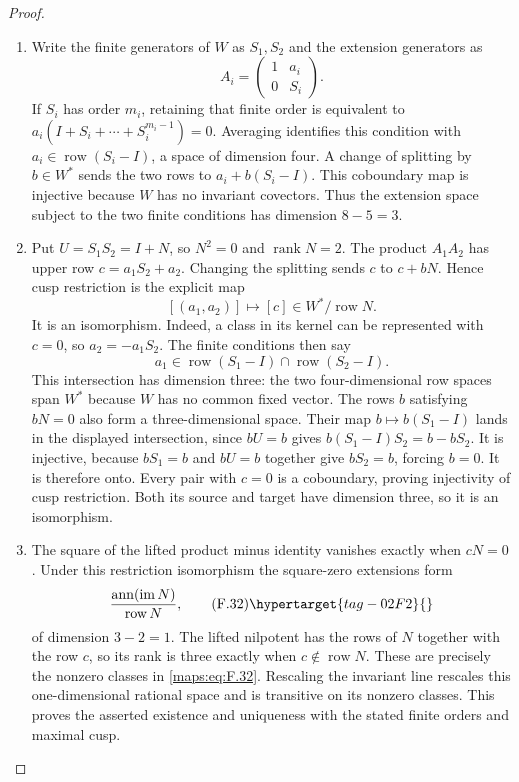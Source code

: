 \begin{proof}
\begin{enumerate}[label={$\langle1\rangle$\arabic*.}]
\item Write the finite generators of $W$ as $S_1,S_2$ and the
extension generators as
\[
 A_i=\begin{pmatrix}1&a_i\\0&S_i\end{pmatrix}.
\]
If $S_i$ has order $m_i$, retaining that finite order is equivalent
to $a_i(I+S_i+\cdots+S_i^{m_i-1})=0$.  Averaging identifies this
condition with $a_i\in\operatorname{row}(S_i-I)$, a space of
dimension four.  A change of splitting by $b\in W^*$ sends the
two rows to $a_i+b(S_i-I)$.  This coboundary map is injective
because $W$ has no invariant covectors.  Thus the extension
space subject to the two finite conditions has dimension $8-5=3$.

\item Put $U=S_1S_2=I+N$, so $N^2=0$ and $\operatorname{rank}N=2$.
The product $A_1A_2$ has upper row $c=a_1S_2+a_2$.
Changing the splitting sends $c$ to $c+bN$.  Hence cusp restriction
is the explicit map
\[
 [(a_1,a_2)]\longmapsto[c]\in W^*/\operatorname{row}N.
\]
It is an isomorphism.  Indeed, a class in its kernel can be
represented with $c=0$, so $a_2=-a_1S_2$.  The finite conditions
then say
\[
 a_1\in\operatorname{row}(S_1-I)
              \cap\operatorname{row}(S_2-I).
\]
This intersection has dimension three: the two four-dimensional
row spaces span $W^*$ because $W$ has no common fixed vector.
The rows $b$ satisfying $bN=0$ also form a three-dimensional
space.  Their map $b\mapsto b(S_1-I)$ lands in the displayed
intersection, since $bU=b$ gives
$b(S_1-I)S_2=b-bS_2$.  It is injective, because
$bS_1=b$ and $bU=b$ together give $bS_2=b$, forcing $b=0$.
It is therefore onto.  Every pair with $c=0$ is a coboundary,
proving injectivity of cusp restriction.  Both its source and
target have dimension three, so it is an isomorphism.

\item The square of the lifted product minus identity vanishes
exactly when $cN=0$.  Under this restriction isomorphism the
square-zero extensions form
\[
 \frac{\operatorname{ann}(\operatorname{im}N)}
      {\operatorname{row}N},
 \tag{F.32}\hypertarget{tag-02F2}{}\label{maps:eq:F.32}
\]
of dimension $3-2=1$.  The lifted nilpotent has the rows of $N$
together with the row $c$, so its rank is three exactly when
$c\notin\operatorname{row}N$.  These are precisely the nonzero
classes in \eqref{maps:eq:F.32}.  Rescaling the invariant line
rescales this one-dimensional rational space and is transitive
on its nonzero classes.  This proves the asserted existence and
uniqueness with the stated finite orders and maximal cusp.
\end{enumerate}
\end{proof}




